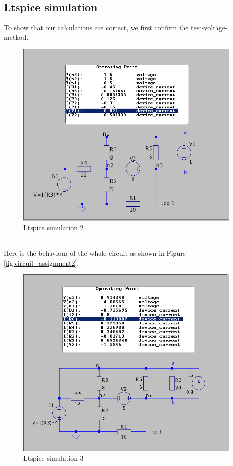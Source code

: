 \documentclass[a4paper]{article}
\begin{document}
\subsection{Ltspice simulation}
To show that our calculations are correct, we first confirm the test-voltage-method. 
\begin{figure}[h!]\centering
   \includegraphics[scale=0.5]{./Figures/ltspice_testvoltage.png} 
\caption{Ltspice simulation 2}
\label{fig:ltspice_2}
\end{figure}
\\Here is the behaviour of the whole circuit as shown in Figure \ref{fig:circuit_assignment2},
\begin{figure}[h!]\centering
   \includegraphics[scale=0.5]{./Figures/ltspice_all.png} 
\caption{Ltspice simulation 3}
\label{fig:ltspice_3}
\end{figure}
\end{document}
